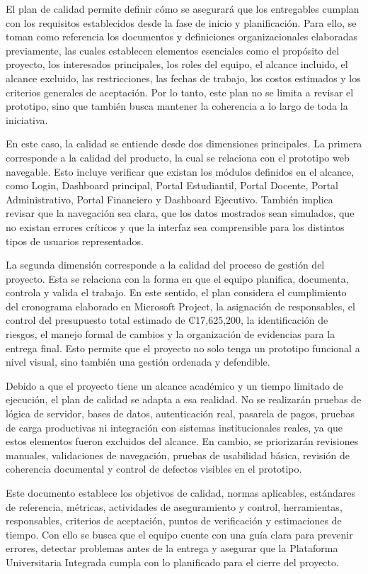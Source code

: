 \documentclass[11pt,spanish]{article}
\begin{document}
El plan de calidad permite definir cómo se asegurará que los entregables cumplan con los requisitos establecidos desde la fase de inicio y planificación. Para ello, se toman como referencia los documentos y definiciones organizacionales elaboradas previamente, las cuales establecen elementos esenciales como el propósito del proyecto, los interesados principales, los roles del equipo, el alcance incluido, el alcance excluido, las restricciones, las fechas de trabajo, los costos estimados y los criterios generales de aceptación. Por lo tanto, este plan no se limita a revisar el prototipo, sino que también busca mantener la coherencia a lo largo de toda la iniciativa.

En este caso, la calidad se entiende desde dos dimensiones principales. La primera corresponde a la calidad del producto, la cual se relaciona con el prototipo web navegable. Esto incluye verificar que existan los módulos definidos en el alcance, como Login, Dashboard principal, Portal Estudiantil, Portal Docente, Portal Administrativo, Portal Financiero y Dashboard Ejecutivo. También implica revisar que la navegación sea clara, que los datos mostrados sean simulados, que no existan errores críticos y que la interfaz sea comprensible para los distintos tipos de usuarios representados.

La segunda dimensión corresponde a la calidad del proceso de gestión del proyecto. Esta se relaciona con la forma en que el equipo planifica, documenta, controla y valida el trabajo. En este sentido, el plan considera el cumplimiento del cronograma elaborado en Microsoft Project, la asignación de responsables, el control del presupuesto total estimado de ₡17,625,200, la identificación de riesgos, el manejo formal de cambios y la organización de evidencias para la entrega final. Esto permite que el proyecto no solo tenga un prototipo funcional a nivel visual, sino también una gestión ordenada y defendible.

Debido a que el proyecto tiene un alcance académico y un tiempo limitado de ejecución, el plan de calidad se adapta a esa realidad. No se realizarán pruebas de lógica de servidor, bases de datos, autenticación real, pasarela de pagos, pruebas de carga productivas ni integración con sistemas institucionales reales, ya que estos elementos fueron excluidos del alcance. En cambio, se priorizarán revisiones manuales, validaciones de navegación, pruebas de usabilidad básica, revisión de coherencia documental y control de defectos visibles en el prototipo.

Este documento establece los objetivos de calidad, normas aplicables, estándares de referencia, métricas, actividades de aseguramiento y control, herramientas, responsables, criterios de aceptación, puntos de verificación y estimaciones de tiempo. Con ello se busca que el equipo cuente con una guía clara para prevenir errores, detectar problemas antes de la entrega y asegurar que la Plataforma Universitaria Integrada cumpla con lo planificado para el cierre del proyecto.
\end{document}
